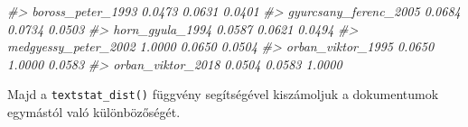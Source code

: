 \documentclass[
]{book}
\newenvironment{Shaded}{\begin{snugshade}}{\end{snugshade}}
\newcommand{\CommentTok}[1]{\textcolor[rgb]{0.56,0.35,0.01}{\textit{#1}}}
\begin{document}
\begin{Shaded}
\begin{Highlighting}[]
\CommentTok{\#\textgreater{} boross\_peter\_1993                   0.0473            0.0631            0.0401}
\CommentTok{\#\textgreater{} gyurcsany\_ferenc\_2005               0.0684            0.0734            0.0503}
\CommentTok{\#\textgreater{} horn\_gyula\_1994                     0.0587            0.0621            0.0494}
\CommentTok{\#\textgreater{} medgyessy\_peter\_2002                1.0000            0.0650            0.0504}
\CommentTok{\#\textgreater{} orban\_viktor\_1995                   0.0650            1.0000            0.0583}
\CommentTok{\#\textgreater{} orban\_viktor\_2018                   0.0504            0.0583            1.0000}
\end{Highlighting}
\end{Shaded}

Majd a \texttt{textstat\_dist()} függvény segítségével kiszámoljuk a
dokumentumok egymástól való különbözőségét.
\end{document}
